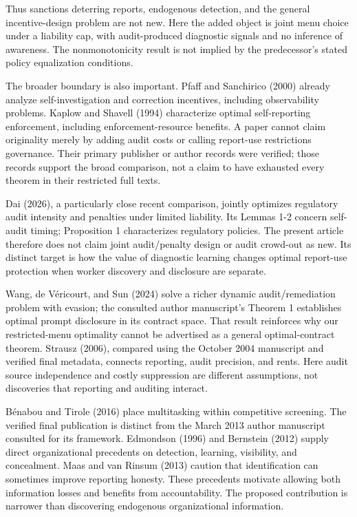 \documentclass[
  11pt,
]{article}
\begin{document}
Thus sanctions deterring reports, endogenous detection, and the general
incentive-design problem are not new. Here the added object is joint
menu choice under a liability cap, with audit-produced diagnostic
signals and no inference of awareness. The nonmonotonicity result is not
implied by the predecessor's stated policy equalization conditions.

The broader boundary is also important. Pfaff and Sanchirico (2000)
already analyze self-investigation and correction incentives, including
observability problems. Kaplow and Shavell (1994) characterize optimal
self-reporting enforcement, including enforcement-resource benefits. A
paper cannot claim originality merely by adding audit costs or calling
report-use restrictions governance. Their primary publisher or author
records were verified; those records support the broad comparison, not a
claim to have exhausted every theorem in their restricted full texts.

Dai (2026), a particularly close recent comparison, jointly optimizes
regulatory audit intensity and penalties under limited liability. Its
Lemmas 1-2 concern self-audit timing; Proposition 1 characterizes
regulatory policies. The present article therefore does not claim joint
audit/penalty design or audit crowd-out as new. Its distinct target is
how the value of diagnostic learning changes optimal report-use
protection when worker discovery and disclosure are separate.

Wang, de Véricourt, and Sun (2024) solve a richer dynamic
audit/remediation problem with evasion; the consulted author
manuscript's Theorem 1 establishes optimal prompt disclosure in its
contract space. That result reinforces why our restricted-menu
optimality cannot be advertised as a general optimal-contract theorem.
Strausz (2006), compared using the October 2004 manuscript and verified
final metadata, connects reporting, audit precision, and rents. Here
audit source independence and costly suppression are different
assumptions, not discoveries that reporting and auditing interact.

Bénabou and Tirole (2016) place multitasking within competitive
screening. The verified final publication is distinct from the March
2013 author manuscript consulted for its framework. Edmondson (1996) and
Bernstein (2012) supply direct organizational precedents on detection,
learning, visibility, and concealment. Maas and van Rinsum (2013)
caution that identification can sometimes improve reporting honesty.
These precedents motivate allowing both information losses and benefits
from accountability. The proposed contribution is narrower than
discovering endogenous organizational information.
\end{document}
